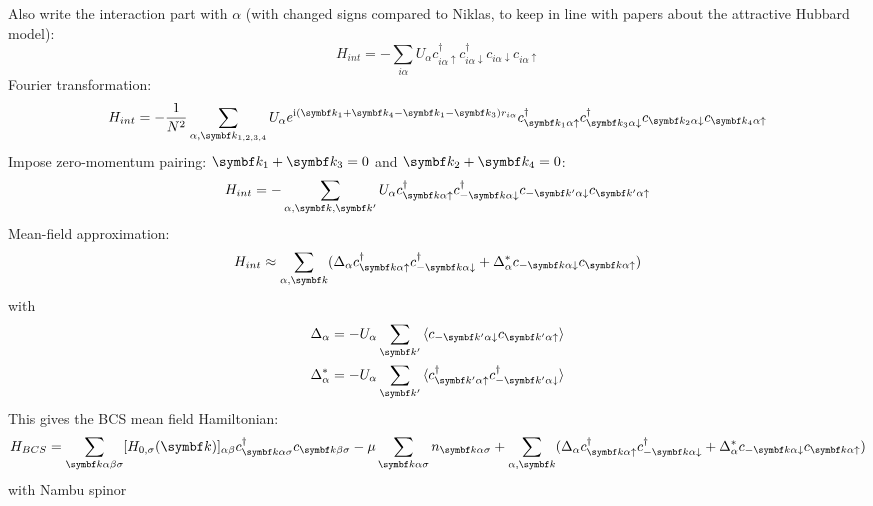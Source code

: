 \documentclass[../notes.tex]{subfiles}
\begin{document}
Also write the interaction part with \(\alpha\) (with changed signs compared to Niklas, to keep in line with papers about the attractive Hubbard model):
\begin{equation}
	H_{int} = - \sum_{i \alpha} U_{\alpha} c_{i\alpha \uparrow}^{\dagger} c_{i\alpha \downarrow}^{\dagger} c_{i\alpha \downarrow} c_{i\alpha \uparrow}
\end{equation}
Fourier transformation:
\begin{equation}
	H_{int} = - \frac{1}{N^2} \sum_{\alpha, \vb{k}_{1, 2, 3, 4}} U_{\alpha} e^{\iu (\vb{k}_1 + \vb{k}_4 - \vb{k}_1 - \vb{k}_3) r_{i \alpha}}  c_{\vb{k}_1 \alpha \uparrow}^{\dagger} c_{\vb{k}_3 \alpha \downarrow}^{\dagger} c_{\vb{k}_2 \alpha \downarrow} c_{\vb{k}_4 \alpha \uparrow}
\end{equation}
Impose zero-momentum pairing: \(\vb{k}_1 + \vb{k}_3 = 0\) and \(\vb{k}_2 + \vb{k}_4 = 0\):
\begin{align}
	H_{int} = - \sum_{\alpha, \vb{k}, \vb{k}^{\prime}} U_{\alpha} c_{\vb{k} \alpha \uparrow}^{\dagger} c_{-\vb{k} \alpha \downarrow}^{\dagger} c_{-\vb{k}^{\prime} \alpha \downarrow} c_{\vb{k}^{\prime} \alpha \uparrow}
\end{align}
Mean-field approximation:
\begin{align}
	H_{int} \approx \sum_{\alpha, \vb{k}} (\Delta_{\alpha} c_{\vb{k} \alpha \uparrow}^{\dagger} c_{-\vb{k} \alpha \downarrow}^{\dagger} + \Delta_{\alpha}^* c_{-\vb{k} \alpha \downarrow} c_{\vb{k} \alpha \uparrow})
\end{align}
with
\begin{align}
	\Delta_{\alpha} &= - U_{\alpha} \sum_{\vb{k}^{\prime}} \braket{c_{-\vb{k}^{\prime} \alpha \downarrow} c_{\vb{k}^{\prime} \alpha \uparrow}} \\
	\Delta_{\alpha}^* &= - U_{\alpha} \sum_{\vb{k}^{\prime}} \braket{c_{\vb{k}^{\prime} \alpha \uparrow}^{\dagger} c_{-\vb{k}^{\prime} \alpha \downarrow}^{\dagger}}
\end{align}
This gives the BCS mean field Hamiltonian:
\begin{align}
	H_{BCS} = \sum_{\vb{k} \alpha \beta \sigma} [H_{0, \sigma} (\vb{k})]_{\alpha \beta} c_{\vb{k} \alpha \sigma}^{\dagger} c_{\vb{k} \beta \sigma}
	-\mu \sum_{\vb{k} \alpha \sigma} n_{\vb{k} \alpha \sigma}
	+ \sum_{\alpha, \vb{k}} (\Delta_{\alpha} c_{\vb{k} \alpha \uparrow}^{\dagger} c_{-\vb{k} \alpha \downarrow}^{\dagger} + \Delta_{\alpha}^* c_{-\vb{k} \alpha \downarrow} c_{\vb{k} \alpha \uparrow})
\end{align}
with Nambu spinor
\end{document}
